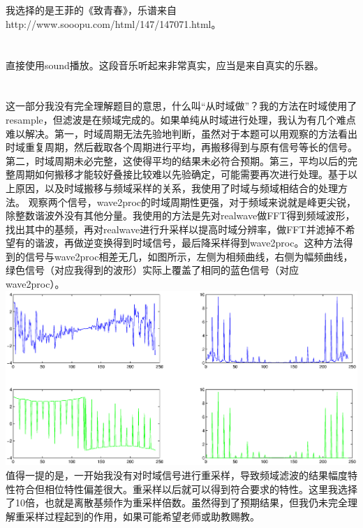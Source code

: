 \section{}
\noindent{}
\par
我选择的是王菲的《致青春》，乐谱来自http://www.sooopu.com/html/147/147071.html。
\section{}
\noindent{}
\par
直接使用sound播放。这段音乐听起来非常真实，应当是来自真实的乐器。
\section{}
\noindent{}
\par
这一部分我没有完全理解题目的意思，什么叫“从时域做”？我的方法在时域使用了resample，但滤波是在频域完成的。如果单纯从时域进行处理，我认为有几个难点难以解决。第一，时域周期无法先验地判断，虽然对于本题可以用观察的方法看出时域重复周期，然后截取各个周期进行平均，再搬移得到与原有信号等长的信号。第二，时域周期未必完整，这使得平均的结果未必符合预期。第三，平均以后的完整周期如何搬移才能较好叠接比较难以先验确定，可能需要再次进行处理。基于以上原因，以及时域搬移与频域采样的关系，我使用了时域与频域相结合的处理方法。
观察两个信号，wave2proc的时域周期性更强，对于频域来说就是峰更尖锐，除整数谐波外没有其他分量。我使用的方法是先对realwave做FFT得到频域波形，找出其中的基频，再对realwave进行升采样以提高时域分辨率，做FFT并滤掉不希望有的谐波，再做逆变换得到时域信号，最后降采样得到wave2proc。这种方法得到的信号与wave2proc相差无几，如图所示，左侧为相频曲线，右侧为幅频曲线，绿色信号（对应我得到的波形）实际上覆盖了相同的蓝色信号（对应wave2proc）。
\includegraphics[width=\textwidth]{A1_7.eps}
值得一提的是，一开始我没有对时域信号进行重采样，导致频域滤波的结果幅度特性符合但相位特性偏差很大。重采样以后就可以得到符合要求的特性。这里我选择了10倍，也就是离散基频作为重采样倍数。虽然得到了预期结果，但我仍未完全理解重采样过程起到的作用，如果可能希望老师或助教赐教。
